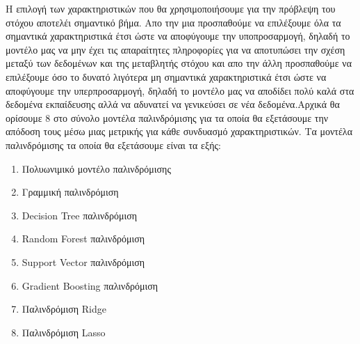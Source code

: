 \documentclass[12pt]{article}
\begin{document}
Η επιλογή των χαρακτηριστικών που θα χρησιμοποιήσουμε για την πρόβλεψη του στόχου αποτελέι σημαντικό βήμα. Απο την μια προσπαθούμε να επιλέξουμε όλα τα σημαντικά χαρακτηριστικά έτσι ώστε να αποφύγουμε την υποπροσαρμογή, δηλαδή το μοντέλο μας να μην έχει τις απαραίτητες πληροφορίες για να αποτυπώσει την σχέση μεταξύ των δεδομένων και της μεταβλητής στόχου και απο την άλλη προσπαθούμε να επιλέξουμε όσο το δυνατό λιγότερα μη σημαντικά χαρακτηριστικά έτσι ώστε να αποφύγουμε την υπερπροσαρμογή, δηλαδή το μοντέλο μας να αποδίδει πολύ καλά στα δεδομένα εκπαίδευσης αλλά να αδυνατεί να γενικεύσει σε νέα δεδομένα.Αρχικά θα ορίσουμε 8 στο σύνολο μοντέλα παλινδρόμισης για τα οποία θα εξετάσουμε την απόδοση τους μέσω μιας μετρικής για κάθε συνδυασμό χαρακτηριστικών. Τα μοντέλα παλινδρόμισης τα οποία θα εξετάσουμε είναι τα εξής:\\
\begin{enumerate}
    \item Πολυωνιμικό μοντέλο παλινδρόμισης
    \item Γραμμική παλινδρόμιση
    \item Decision Tree παλινδρόμιση
    \item Random Forest παλινδρόμιση
    \item Support Vector παλινδρόμιση
    \item Gradient Boosting παλινδρόμιση
    \item Παλινδρόμιση Ridge
    \item Παλινδρόμιση Lasso\\
\end{enumerate}
\end{document}

